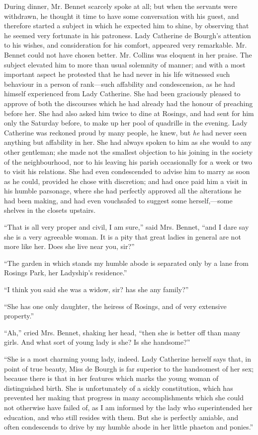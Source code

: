 During dinner, Mr. Bennet scarcely spoke at all; but when the servants were withdrawn, he thought it time to have some conversation with his guest, and therefore started a subject in which he expected him to shine, by observing that he seemed very fortunate in his patroness. Lady Catherine de Bourgh's attention to his wishes, and consideration for his comfort, appeared very remarkable. Mr. Bennet could not have chosen better. Mr. Collins was eloquent in her praise. The subject elevated him to more than usual solemnity of manner; and with a most important aspect he protested that he had never in his life witnessed such behaviour in a person of rank---such affability and condescension, as he had himself experienced from Lady Catherine. She had been graciously pleased to approve of both the discourses which he had already had the honour of preaching before her. She had also asked him twice to dine at Rosings, and had sent for him only the Saturday before, to make up her pool of quadrille in the evening. Lady Catherine was reckoned proud by many people, he knew, but \textit{he} had never seen anything but affability in her. She had always spoken to him as she would to any other gentleman; she made not the smallest objection to his joining in the society of the neighbourhood, nor to his leaving his parish occasionally for a week or two to visit his relations. She had even condescended to advise him to marry as soon as he could, provided he chose with discretion; and had once paid him a visit in his humble parsonage, where she had perfectly approved all the alterations he had been making, and had even vouchsafed to suggest some herself,---some shelves in the closets upstairs.

``That is all very proper and civil, I am sure,'' said Mrs. Bennet, ``and I dare say she is a very agreeable woman. It is a pity that great ladies in general are not more like her. Does she live near you, sir?''

``The garden in which stands my humble abode is separated only by a lane from Rosings Park, her Ladyship's residence.''

``I think you said she was a widow, sir? has she any family?''

``She has one only daughter, the heiress of Rosings, and of very extensive property.''

``Ah,'' cried Mrs. Bennet, shaking her head, ``then she is better off than many girls. And what sort of young lady is she? Is she handsome?''

``She is a most charming young lady, indeed. Lady Catherine herself says that, in point of true beauty, Miss de Bourgh is far superior to the handsomest of her sex; because there is that in her features which marks the young woman of distinguished birth. She is unfortunately of a sickly constitution, which has prevented her making that progress in many accomplishments which she could not otherwise have failed of, as I am informed by the lady who superintended her education, and who still resides with them. But she is perfectly amiable, and often condescends to drive by my humble abode in her little phaeton and ponies.''

